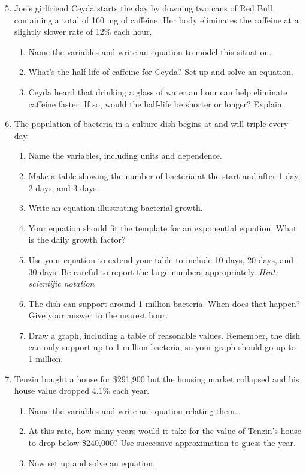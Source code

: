 \begin{enumerate} 
\setcounter{enumi}{4}
\item Joe's girlfriend Ceyda starts the day by downing two cans of Red Bull, containing a total of 160 mg of caffeine.  Her body eliminates the caffeine at a slightly slower rate of 12\% each hour.  
\begin{enumerate}
\item Name the variables and write an equation to model this situation.  
\item What's the half-life of caffeine for Ceyda?  Set up and solve an equation.
\item Ceyda heard that drinking a glass of water an hour can help eliminate caffeine faster.  If so, would the half-life be shorter or longer?  Explain.
\end{enumerate}

\item  The population of bacteria in a culture dish begins at  and will triple every day.  
\begin{enumerate}
\item Name the variables, including units and dependence.
\item Make a table showing the number of bacteria at the start and after 1 day, 2 days, and 3 days.
\item Write an equation illustrating bacterial growth.
\item Your equation should fit the template for an exponential equation. What is the daily growth factor?
\item Use your equation to extend your table to include 10 days, 20 days, and 30 days. Be careful to report the large numbers appropriately.  \emph{Hint: scientific notation}
\item The dish can support around 1 million bacteria.  When does that happen?  Give your answer to the nearest hour.
\item Draw a graph, including a table of reasonable values.  Remember, the dish can only support up to 1 million bacteria, so your graph should go up to 1 million.
\end{enumerate}

\item Tenzin bought a house for \$291,900 but the housing market collapsed and his house value dropped 4.1\% each year. 
 \begin{enumerate}
\item Name the variables and write an equation relating them.
\item At this rate, how many years would it take for the value of Tenzin's house to drop below \$240,000?  Use successive approximation to guess the year.
\item Now set up and solve an equation.
\end{enumerate}


\end{enumerate}
